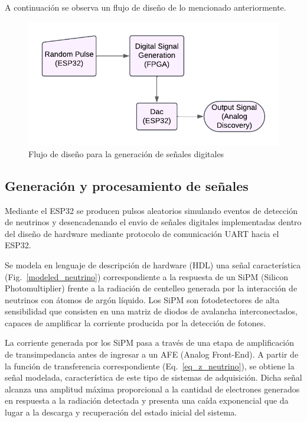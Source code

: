     A continuación se observa un flujo de diseño de lo mencionado anteriormente.

    \vspace{0.3cm}

        \begin{figure}[H]
        \centerline{\includegraphics[scale=0.6]{montaje.pdf}}
        \caption{Flujo de diseño para la generación de señales digitales}
        \label{flujo_de_diseño}
        \end{figure}



    \vspace{0.3cm}
   \subsection{Generación y procesamiento de señales}
    
    Mediante el ESP32 se producen pulsos aleatorios simulando eventos de detección de neutrinos y desencadenando el envio de señales digitales implementadas dentro del diseño de hardware mediante protocolo de comunicación UART hacia el ESP32.
        
    Se modela en lenguaje de descripción de hardware (HDL) una señal característica (Fig.~\ref{modeled_neutrino}) correspondiente a la respuesta de un SiPM (Silicon Photomultiplier) frente a la radiación de centelleo generada por la interacción de neutrinos con átomos de argón líquido. Los SiPM son fotodetectores de alta sensibilidad que consisten en una matriz de diodos de avalancha interconectados, capaces de amplificar la corriente producida por la detección de fotones.

    La corriente generada por los SiPM pasa a través de una etapa de amplificación de transimpedancia antes de ingresar a un AFE (Analog Front-End). A partir de la función de transferencia correspondiente (Eq.~\ref{eq_z_neutrino}), se obtiene la señal modelada, característica de este tipo de sistemas de adquisición. Dicha señal alcanza una amplitud máxima proporcional a la cantidad de electrones generados en respuesta a la radiación detectada y presenta una caída exponencial que da lugar a la descarga y recuperación del estado inicial del sistema.

